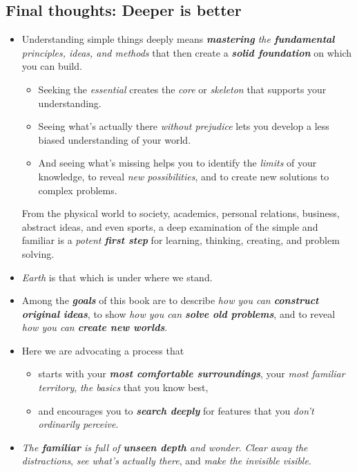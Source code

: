 \documentclass[11pt]{article}
\begin{document}
\subsection{Final thoughts: Deeper is better}
\begin{itemize}
\item Understanding simple things deeply means \emph{\textbf{mastering} the \textbf{fundamental} principles, ideas, and methods} that then create a \emph{\textbf{solid foundation}} on which you can build. 
\begin{itemize}
\item Seeking the \emph{essential} creates the \emph{core} or \emph{skeleton} that supports your understanding. 
\item Seeing what’s actually there \emph{without prejudice }lets you develop a less biased understanding of your world.
\item And seeing what’s missing helps you to identify the \emph{limits} of your knowledge, to reveal \emph{new possibilities}, and to create new solutions to complex problems. 
\end{itemize} 

From the physical world to society, academics, personal relations, business, abstract ideas, and even sports, a deep examination of the simple and familiar is a \emph{potent \textbf{first step}} for learning, thinking, creating, and problem solving.

\item \emph{Earth} is that which is under where we stand.

\item  Among the \emph{\textbf{goals}} of this book are to describe \emph{how you can \textbf{construct original ideas}}, to show \emph{how you can \textbf{solve old problems}}, and to reveal \emph{how you can \textbf{create new worlds}}. 

\item Here we are advocating a process that
\begin{itemize}
\item starts with your \emph{\textbf{most comfortable surroundings}}, your \emph{most familiar territory}, \emph{the basics} that you know best, 
\item and encourages you to \emph{\textbf{search deeply}} for features that you \emph{don’t ordinarily perceive}.
\end{itemize}

\item \emph{The \textbf{familiar} is full of \textbf{unseen depth} and wonder}. \emph{Clear away the distractions}, \emph{see what’s actually there}, and \emph{make the invisible visible}.
\end{itemize}
\end{document}
